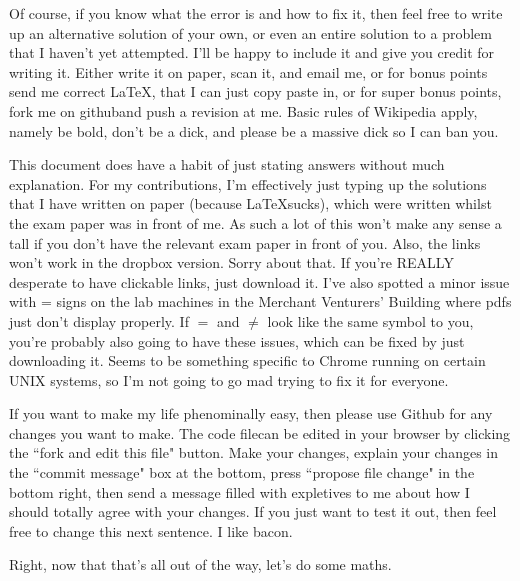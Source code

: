 \documentclass{article}
\begin{document}
Of course, if you know what the error is and how to fix it, then feel free to
write up an alternative solution of your own, or even an entire solution to a
problem that I haven't yet attempted. I'll be happy to include it and give you
credit for writing it. Either write it on paper, scan it, and email
me\footnotemark[1], or for bonus points send me correct \LaTeX, that I can just
copy paste in, or for super bonus points, fork me on
github\footnotemark[4]
and push a revision at me. Basic rules of Wikipedia apply, namely be bold, don't
be a dick, and please be a massive dick so I can ban you.

This document does have a habit of just stating answers without much
explanation. For my contributions, I'm effectively just typing up the solutions
that I have written on paper (because \LaTeX sucks), which were written whilst
the exam paper was in front of me. As such a lot of this won't make any sense a
tall if you don't have the relevant exam paper in front of you. Also, the links
won't work in the dropbox version. Sorry about that. If you're REALLY desperate
to have clickable links, just download it. I've also spotted a minor issue with
= signs on the lab machines in the Merchant Venturers' Building where pdfs just
don't display properly. If $=$ and $\neq$ look like the same symbol to you,
you're probably also going to have these issues, which can be fixed by just
downloading it. Seems to be something specific to Chrome running on certain UNIX
systems, so I'm not going to go mad trying to fix it for everyone.

If you want to make my life phenominally easy, then please use Github for any
changes you want to make. The code file\footnotemark[4] can be edited in your
browser by clicking the ``fork and edit this file" button. Make your changes,
explain your changes in the ``commit
message" box at the bottom, press ``propose file change" in the bottom right,
then send a message filled with expletives to me about how I should totally
agree with your changes. If you just want to test it out, then feel free to
change this next sentence. I like bacon.

Right, now that that's all out of the way, let's do some maths.

\clearpage
\end{document}
